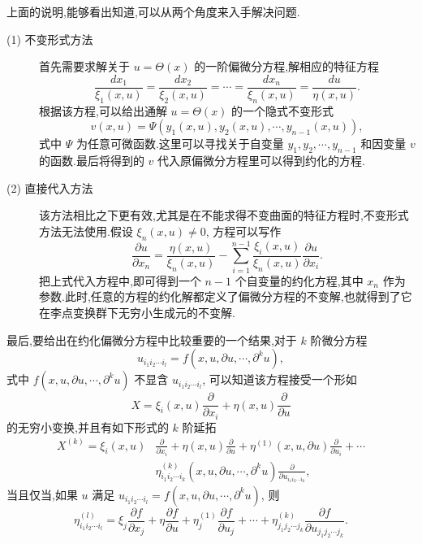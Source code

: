 上面的说明,能够看出知道,可以从两个角度来入手解决问题.
\begin{description}
	\item[(1) 不变形式方法] 首先需要求解关于 $u=\Theta(x)$ 的一阶偏微分方程,解相应的特征方程
	\begin{equation*}
		\frac{dx_1}{\xi_1(x,u)}=\frac{dx_2}{\xi_2(x,u)}=\cdots=\frac{dx_n}{\xi_n(x,u)}=\frac{du}{\eta(x,u)}.
\end{equation*}
根据该方程,可以给出通解 $u=\Theta(x)$ 的一个隐式不变形式
\begin{equation*}
	v(x,u)=\Psi(y_1(x,u),y_2(x,u),\cdots,y_{n-1}(x,u)),
\end{equation*}
式中 $\Psi$ 为任意可微函数.这里可以寻找关于自变量 $y_1,y_2,\cdots,y_{n-1}$ 和因变量 $v$ 的函数.最后将得到的 $v$ 代入原偏微分方程里可以得到约化的方程.
	\item[(2) 直接代入方法] 该方法相比之下更有效,尤其是在不能求得不变曲面的特征方程时,不变形式方法无法使用.假设 $\xi_n(x,u)\neq 0$, 方程可以写作
	\begin{equation*}
		\frac{\partial u}{\partial x_n}=\frac{\eta(x,u)}{\xi_n(x,u)}-\sum_{i=1}^{n-1}\frac{\xi_i(x,u)}{\xi_n(x,u)}\frac{\partial u}{\partial x_i}.
	\end{equation*}
	把上式代入方程中,即可得到一个 $n-1$ 个自变量的约化方程,其中 $x_n$ 作为参数.此时,任意的方程的约化解都定义了偏微分方程的不变解,也就得到了它在李点变换群下无穷小生成元的不变解.
\end{description}

最后,要给出在约化偏微分方程中比较重要的一个结果,对于 $k$ 阶微分方程
\begin{equation*}
	u_{i_1i_2\cdots i_l}=f(x,u,\partial u,\cdots,\partial ^k u),
\end{equation*}
式中 $f(x,u,\partial u,\cdots,\partial ^k u)$ 不显含 $u_{i_1i_2\cdots i_l}$, 可以知道该方程接受一个形如
\begin{equation*}
	X=\xi_i(x,u)\frac{\partial}{\partial x_i}+\eta(x,u)\frac{\partial}{\partial u}
\end{equation*}
的无穷小变换,并且有如下形式的 $k$ 阶延拓
\begin{equation*}
\begin{aligned}
X^{(k)}=\xi_i(x,u)&\frac{\partial}{\partial x_i}+\eta(x,u)\frac{\partial}{\partial u}+\eta^{(1)}(x,u,\partial u)\frac{\partial}{\partial u_i}+\cdots \\
&\eta^{(k)}_{i_1i_2\cdots i_k}(x,u,\partial u,\cdots,\partial ^k u)\frac{\partial}{\partial u_{i_1i_2\cdots i_k}},
\end{aligned}
\end{equation*}
当且仅当,如果 $u$ 满足 $u_{i_1i_2\cdots i_l}=f(x,u,\partial u,\cdots,\partial ^k u)$, 则
\begin{equation*}
	\eta_{i_1i_2\cdots i_l}^{(l)}=\xi_j\frac{\partial f}{\partial x_j}+\eta\frac{\partial f}{\partial u}+\eta_j^{(1)}\frac{\partial f}{\partial u_j}+\cdots+\eta_{j_1j_2\cdots j_k}^{(k)}\frac{\partial f}{\partial u_{j_1j_2\cdots j_k}}.
\end{equation*}

